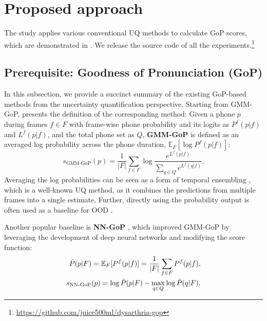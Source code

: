 \section{Proposed approach} \label{sec:gop}
The study applies various conventional UQ methods to calculate GoP scores, which are demonstrated in .
We release the source code of all the experiments.\footnote{\url{https://github.com/juice500ml/dysarthria-gop}\label{footnote:repo_url}}

\subsection{Prerequisite: Goodness of Pronunciation (GoP)} \label{ssec:gop-baseline}
In this subsection, we provide a succinct summary of the existing GoP-based methods from the uncertainty quantification perspective.
Starting from GMM-GoP,  presents the definition of the corresponding method:
Given a phone $p$ during frames $f \in F$ with frame-wise phone probability and its logits as $P^f(p|f)$ and $L^f(p|f)$, and the total phone set as $Q$, \textbf{GMM-GoP} \cite{witt2000phone} is defined as an averaged log probability across the phone duration, $\mathbb{E}_F[\log P^f(p|f)]$:
\begin{equation}
    s_\text{GMM-GoP}(p) = \frac{1}{|F|} \sum_{f \in F} \log \frac{e^{L^f(p|f)}}{ \sum_{q \in Q} e^{L^f(q|f)}}.
\label{eq:gmm-gop}
\end{equation}
Averaging the log probabilities can be seen as a form of temporal ensembling \cite{laine2017temporal}, which is a well-known UQ method, as it combines the predictions from multiple frames into a single estimate. 
Further, directly using the probability output is often used as a baseline for OOD \cite{hendrycks2017baseline}.


Another popular baseline is \textbf{NN-GoP} \cite{hu2015improved}, which improved GMM-GoP by leveraging the development of deep neural networks and modifying the score function:
\begin{align}
    \Bar{P}(p|F) = \mathbb{E}_F[P^f(p|f)] = \frac{1}{|F|} \sum_{f \in F} P^f(p|f), \\ 
    s_\text{NN-GoP}(p) = \log \Bar{P}(p|F) - \max_{q \in Q} \log \Bar{P}(q|F). \label{eq:nn-gop}
\end{align}


